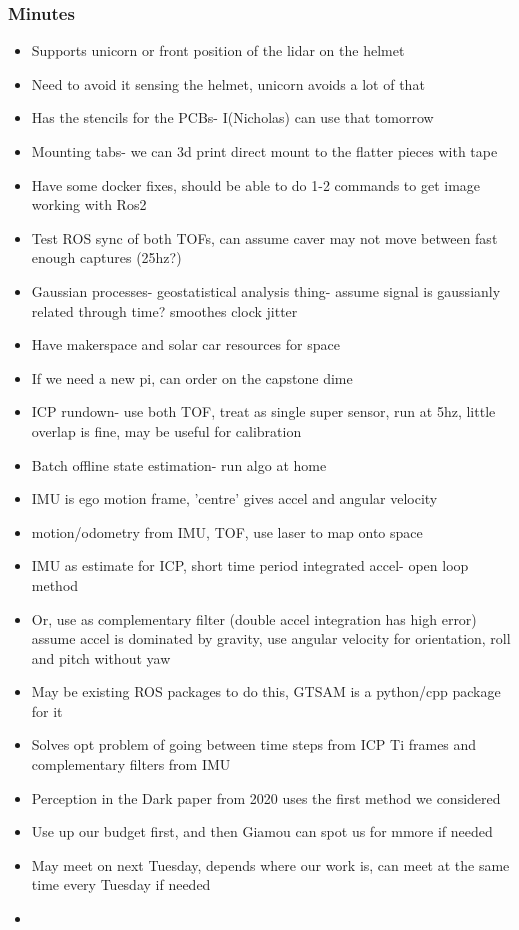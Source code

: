 		\subsubsection*{Minutes}
			\begin{itemize}
				\item Supports unicorn or front position of the lidar on the helmet
				\item Need to avoid it sensing the helmet, unicorn avoids a lot of that
				\item Has the stencils for the PCBs- I(Nicholas) can use that tomorrow
				\item Mounting tabs- we can 3d print direct mount to the flatter pieces with tape
				\item Have some docker fixes, should be able to do 1-2 commands to get image working with Ros2
				\item Test ROS sync of both TOFs, can assume caver may not move between fast enough captures (25hz?)
				\item Gaussian processes- geostatistical analysis thing- assume signal is gaussianly related through time? smoothes clock jitter
				\item Have makerspace and solar car resources for space
				\item If we need a new pi, can order on the capstone dime
				\item ICP rundown- use both TOF, treat as single super sensor, run at 5hz, little overlap is fine, may be useful for calibration
				\item Batch offline state estimation- run algo at home
				\item IMU is ego motion frame, 'centre' gives accel and angular velocity
				\item motion/odometry from IMU, TOF, use laser to map onto space
				\item IMU as estimate for ICP, short time period integrated accel- open loop method
				\item Or, use as complementary filter (double accel integration has high error) assume accel is dominated by gravity, use angular velocity for orientation, roll and pitch without yaw
				\item May be existing ROS packages to do this, GTSAM is a python/cpp package for it 
				\item Solves opt problem of going between time steps from ICP Ti frames and complementary filters from IMU
				\item Perception in the Dark paper from 2020 uses the first method we considered
				\item Use up our budget first, and then Giamou can spot us for mmore if needed
				\item May meet on next Tuesday, depends where our work is, can meet at the same time every Tuesday if needed 
				\item 
			\end{itemize}

